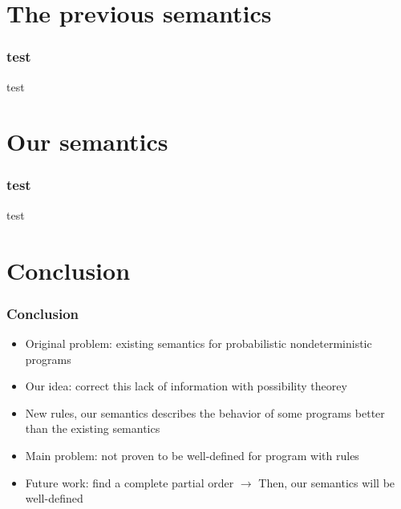 \documentclass{beamer}
\begin{document}
\section{The previous semantics}

\begin{frame}
\frametitle{test}
test
\end{frame}

\section{Our semantics}

\begin{frame}
\frametitle{test}
test
\end{frame}

\section{Conclusion}

\begin{frame}
\frametitle{Conclusion}
\begin{itemize}
\item<1-> Original problem: existing semantics for probabilistic nondeterministic programs\newline
{}
\item<3-> Our idea: correct this lack of information with possibility theorey
\item<4-> New rules, our semantics describes the behavior of some programs better than the existing semantics
\item<5-> Main problem: not proven to be well-defined for program with rules
\item<6-> Future work: find a complete partial order $\rightarrow$ Then, our semantics will be well-defined
\end{itemize}
\end{frame}
\end{document}
